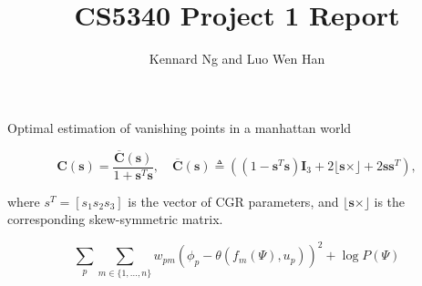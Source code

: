 \documentclass{article}
\title{CS5340 Project 1 Report}
\author{Kennard Ng and Luo Wen Han}
\begin{document}
	\maketitle
	
	
	Optimal estimation of vanishing points in a manhattan world
	
	\begin{equation}
		\mathbf{C}(\mathbf{s})=\frac{\overline{\mathbf{C}}(\mathbf{s})}{1+\mathbf{s}^{T} \mathbf{s}}, \quad \overline{\mathbf{C}}(\mathbf{s}) \triangleq\left(\left(1-\mathbf{s}^{T} \mathbf{s}\right) \mathbf{I}_{3}+2\lfloor\mathbf{s} \times\rfloor+ 2 \mathbf{s} \mathbf{s}^{T}\right),
	\end{equation}
	
	
	where $s^T = [s_1 s_2 s_3]$ is the vector of CGR parameters, and
	$\lfloor\mathbf{s} \times\rfloor$ is the corresponding skew-symmetric matrix.
	
	
	\begin{equation}
		\sum_{p} \sum_{m \in\{1, \ldots, n\}} w_{p m}\left(\phi_{p}-\theta\left(f_{m}(\Psi), u_{p}\right)\right)^{2}+\log P(\Psi)
	\end{equation}
	
	
\end{document}
